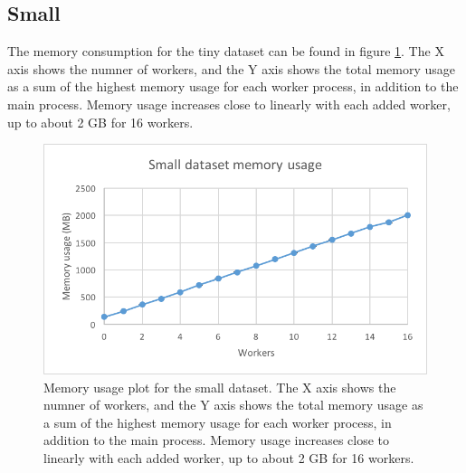 \subsection{Small}
The memory consumption for the tiny dataset can be found in figure \ref{fig:dataset_2_memory}.
The X axis shows the numner of workers, and the Y axis shows the total memory usage as
a sum of the highest memory usage for each worker process, in addition to the main process. Memory usage increases close to linearly with each added worker,
up to about 2 GB for 16 workers.
\begin{figure}[ht]
  \centering
  \includegraphics[width=120mm]{figures/dataset_2/dataset_2_memory.png}
  \caption[Memory usage plot for the small dataset.]{Memory usage plot for the small dataset. The X axis shows the numner of workers, and the Y axis shows the total memory usage as
  a sum of the highest memory usage for each worker process, in addition to the main process. Memory usage increases close to linearly with each added worker,
  up to about 2 GB for 16 workers.}
  \label{fig:dataset_2_memory}
\end{figure}

